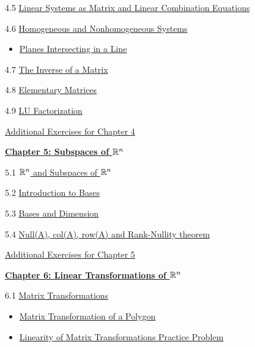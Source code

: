 \documentclass{ximera}
\begin{document}
4.5	\href{https://ximera.osu.edu/oerlinalg/LinearAlgebra/MAT-0030/main}{Linear Systems as Matrix and Linear Combination Equations}
	
4.6	\href{https://ximera.osu.edu/oerlinalg/LinearAlgebra/SYS-0050/main}{Homogeneous and Nonhomogeneous Systems}
\begin{itemize}
    \item 
    \href{https://www.geogebra.org/m/gxjnusja}{Planes Intersecting in a Line}
\end{itemize}

4.7	\href{https://ximera.osu.edu/oerlinalg/LinearAlgebra/MAT-0050/main}{The Inverse of a Matrix}
	
4.8	\href{https://ximera.osu.edu/oerlinalg/LinearAlgebra/MAT-0060/main}{Elementary Matrices}
	
4.9	\href{https://ximera.osu.edu/oerlinalg/LinearAlgebra/MAT-0070/main}{LU Factorization}
	
\href{https://ximera.osu.edu/oerlinalg/LinearAlgebra/SUPX-0040/main}{Additional Exercises for Chapter 4}
	
\href{https://ximera.osu.edu/oerlinalg/LinearAlgebra/XLAChapter_subspacesRn/main}{\textbf{Chapter 5: Subspaces of $\mathbb{R}^n$}}
	
5.1	\href{https://ximera.osu.edu/oerlinalg/LinearAlgebra/VSP-0020/main}{$\mathbb{R}^n$ and Subspaces of $\mathbb{R}^n$}
	
5.2	\href{https://ximera.osu.edu/oerlinalg/LinearAlgebra/VSP-0030/main}{Introduction to Bases}
	
5.3	\href{https://ximera.osu.edu/oerlinalg/LinearAlgebra/VSP-0035/main}{Bases and Dimension}
	
5.4	\href{https://ximera.osu.edu/oerlinalg/LinearAlgebra/VSP-0040/main}{Null(A), col(A), row(A) and Rank-Nullity theorem}
	
\href{https://ximera.osu.edu/oerlinalg/LinearAlgebra/SUPX-0050/main}{Additional Exercises for Chapter 5}
	
\href{https://ximera.osu.edu/oerlinalg/LinearAlgebra/XLAChapter_linTrans/main}{\textbf{Chapter 6: Linear Transformations of $\mathbb{R}^n$}}
	
6.1	\href{https://ximera.osu.edu/oerlinalg/LinearAlgebra/LTR-0005/main}{Matrix Transformations}
\begin{itemize}
    \item 
    \href{https://www.geogebra.org/m/cvxdwput}{Matrix Transformation of a Polygon}
    \item
    \href{https://www.geogebra.org/m/nhs3wnqd}{Linearity of Matrix Transformations Practice Problem}
\end{itemize}
	
\end{document}
